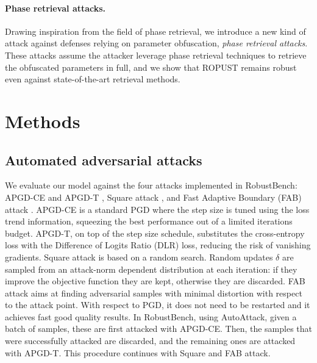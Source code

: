 \documentclass{article}
\begin{document}
\paragraph{Phase retrieval attacks.} Drawing inspiration from the field of phase retrieval, we introduce a new kind of attack against defenses relying on parameter obfuscation, \emph{phase retrieval attacks}. These attacks assume the attacker leverage phase retrieval techniques to retrieve the obfuscated parameters in full, and we show that ROPUST remains robust even against state-of-the-art retrieval methods.

\section{Methods}\label{sec:methods}


\subsection{Automated adversarial attacks}
We evaluate our model against the four attacks implemented in RobustBench: APGD-CE and APGD-T \cite{Croce2020ReliableEO}, Square attack \cite{andriushchenko2019square}, and Fast Adaptive Boundary (FAB) attack \cite{Croce2020MinimallyDA}. APGD-CE is a standard PGD where the step size is tuned using the loss trend information, squeezing the best performance out of a limited iterations budget. APGD-T, on top of the step size schedule, substitutes the cross-entropy loss with the Difference of Logits Ratio (DLR) loss, reducing the risk of vanishing gradients. Square attack is based on a random search. Random updates $\delta$ are sampled from an attack-norm dependent distribution at each iteration: if they improve the objective function they are kept, otherwise they are discarded. FAB attack aims at finding adversarial samples with minimal distortion with respect to the attack point. With respect to PGD, it does not need to be restarted and it achieves fast good quality results. In RobustBench, using AutoAttack, given a batch of samples, these are first attacked with APGD-CE. Then, the samples that were successfully attacked are discarded, and the remaining ones are attacked with APGD-T. This procedure continues with Square and FAB attack.
\end{document}
